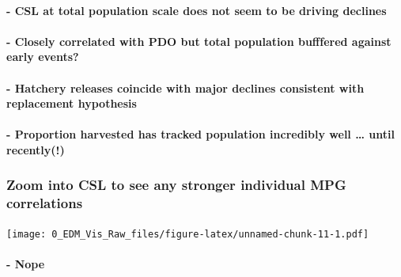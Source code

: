 \documentclass[]{article}
\let\oldparagraph\paragraph
\renewcommand{\paragraph}[1]{\oldparagraph{#1}\mbox{}}
\begin{document}
\hypertarget{csl-at-total-population-scale-does-not-seem-to-be-driving-declines}{%
\paragraph{- CSL at total population scale does not seem to be driving
declines}\label{csl-at-total-population-scale-does-not-seem-to-be-driving-declines}}

\hypertarget{closely-correlated-with-pdo-but-total-population-bufffered-against-early-events}{%
\paragraph{- Closely correlated with PDO but total population bufffered
against early
events?}\label{closely-correlated-with-pdo-but-total-population-bufffered-against-early-events}}

\hypertarget{hatchery-releases-coincide-with-major-declines-consistent-with-replacement-hypothesis}{%
\paragraph{- Hatchery releases coincide with major declines consistent
with replacement
hypothesis}\label{hatchery-releases-coincide-with-major-declines-consistent-with-replacement-hypothesis}}

\hypertarget{proportion-harvested-has-tracked-population-incredibly-well-until-recently}{%
\paragraph{- Proportion harvested has tracked population incredibly well
\ldots{} until
recently(!)}\label{proportion-harvested-has-tracked-population-incredibly-well-until-recently}}

\hypertarget{zoom-into-csl-to-see-any-stronger-individual-mpg-correlations}{%
\subsubsection{Zoom into CSL to see any stronger individual MPG
correlations}\label{zoom-into-csl-to-see-any-stronger-individual-mpg-correlations}}

\texttt{[image: 0\_EDM\_Vis\_Raw\_files/figure-latex/unnamed-chunk-11-1.pdf]}

\hypertarget{nope}{%
\paragraph{- Nope}\label{nope}}
\end{document}
